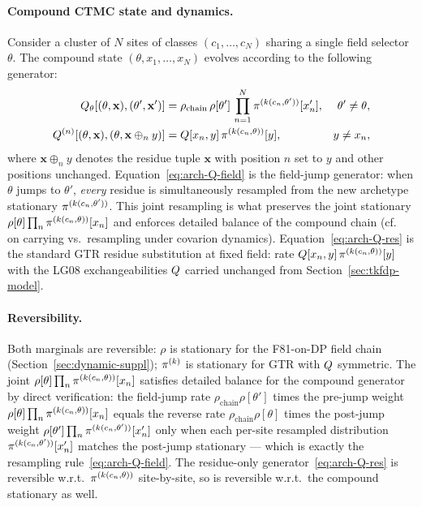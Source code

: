 \paragraph{Compound CTMC state and dynamics.}
Consider a cluster of $N$ sites of classes $(c_1,\dots,c_N)$ sharing a
single field selector $\theta$. The compound state $(\theta, x_1, \dots,
x_N)$ evolves according to the following generator:
\begin{align}
  Q_\theta[(\theta,\mathbf{x}), (\theta',\mathbf{x}')]
    &= \rho_{\text{chain}}\,\rho[\theta']\,\prod_{n=1}^{N}\pi^{(k(c_n,\theta'))}[x'_n],
    &\theta' \ne \theta,
    \label{eq:arch-Q-field}
  \\
  Q^{(n)}[(\theta,\mathbf{x}), (\theta,\mathbf{x}\oplus_n y)]
    &= Q[x_n, y]\,\pi^{(k(c_n,\theta))}[y],
    &y \ne x_n,
    \label{eq:arch-Q-res}
\end{align}
where $\mathbf{x}\oplus_n y$ denotes the residue tuple $\mathbf{x}$
with position $n$ set to $y$ and other positions unchanged.
Equation~\eqref{eq:arch-Q-field} is the field-jump generator: when
$\theta$ jumps to $\theta'$, \emph{every} residue is simultaneously
resampled from the new archetype stationary
$\pi^{(k(c_n,\theta'))}$. This joint resampling is what preserves the
joint stationary $\rho[\theta]\prod_n \pi^{(k(c_n,\theta))}[x_n]$ and
enforces detailed balance of the compound chain
(cf.~\citealp{tuffleysteel1998} on carrying vs.\ resampling under
covarion dynamics). Equation~\eqref{eq:arch-Q-res} is the standard GTR
residue substitution at fixed field: rate $Q[x_n, y]\,
\pi^{(k(c_n,\theta))}[y]$ with the LG08 exchangeabilities $Q$
carried unchanged from Section~\ref{sec:tkfdp-model}.

\paragraph{Reversibility.}
Both marginals are reversible: $\rho$ is stationary for the F81-on-DP
field chain (Section~\ref{sec:dynamic-suppl}); $\pi^{(k)}$ is
stationary for GTR with $Q$ symmetric. The joint
$\rho[\theta]\prod_n \pi^{(k(c_n,\theta))}[x_n]$ satisfies detailed
balance for the compound generator by direct verification: the
field-jump rate $\rho_{\text{chain}}\rho[\theta']$ times the pre-jump
weight $\rho[\theta]\prod_n \pi^{(k(c_n,\theta))}[x_n]$ equals the
reverse rate $\rho_{\text{chain}}\rho[\theta]$ times the post-jump
weight $\rho[\theta']\prod_n \pi^{(k(c_n,\theta'))}[x'_n]$ only when
each per-site resampled distribution $\pi^{(k(c_n,\theta'))}[x'_n]$
matches the post-jump stationary --- which is exactly the resampling
rule~\eqref{eq:arch-Q-field}. The residue-only
generator~\eqref{eq:arch-Q-res} is reversible w.r.t.\
$\pi^{(k(c_n,\theta))}$ site-by-site, so is reversible w.r.t.\ the
compound stationary as well.

